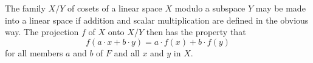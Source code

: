 The family $X/Y$ of cosets of a linear space $X$ modulo a subspace $Y$ may be made into a linear space if addition and scalar multiplication are defined in the obvious way. The projection $f$ of $X$ onto $X/Y$ then has the property that
$$f(a \cdot x + b \cdot y) = a \cdot f(x) + b \cdot f(y)$$
for all members $a$ and $b$ of $F$ and all $x$ and $y$ in $X$.
